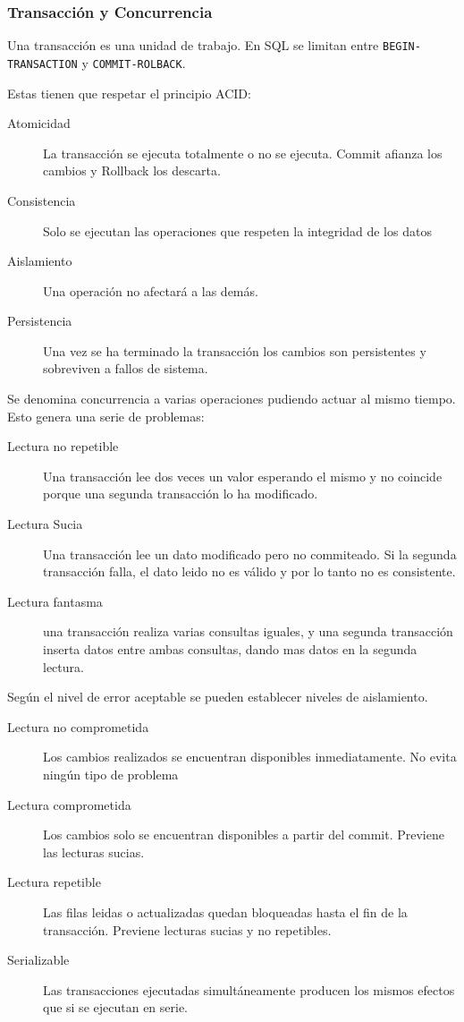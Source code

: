     \subsubsection{Transacción y Concurrencia}
        Una transacción es una unidad de trabajo. En SQL se limitan entre \texttt{BEGIN-TRANSACTION} y \texttt{COMMIT-ROLBACK}.

        Estas tienen que respetar el principio ACID:
        \begin{description}
            \item[Atomicidad] La transacción se ejecuta totalmente o no se ejecuta. Commit afianza los cambios y Rollback los descarta.
            \item[Consistencia] Solo se ejecutan las operaciones que respeten la integridad de los datos
            \item[Aislamiento] Una operación no afectará a las demás.
            \item[Persistencia] Una vez se ha terminado la transacción los cambios son persistentes y sobreviven a fallos de sistema.
        \end{description}

        Se denomina concurrencia a varias operaciones pudiendo actuar al mismo tiempo. Esto genera una serie de problemas:
        \begin{description}
            \item[Lectura no repetible] Una transacción lee dos veces un valor esperando el mismo y no coincide porque una segunda transacción lo ha modificado.
            \item[Lectura Sucia] Una transacción lee un dato modificado pero no commiteado. Si la segunda transacción falla, el dato leido no es válido y por lo tanto no es consistente.
            \item[Lectura fantasma] una transacción realiza varias consultas iguales, y una segunda transacción inserta datos entre ambas consultas, dando mas datos en la segunda lectura.
        \end{description}

        Según el nivel de error aceptable se pueden establecer niveles de aislamiento.

        \begin{description}
            \item[Lectura no comprometida] Los cambios realizados se encuentran disponibles inmediatamente. No evita ningún tipo de problema
            \item[Lectura comprometida] Los cambios solo se encuentran disponibles a partir del commit. Previene las lecturas sucias.
            \item[Lectura repetible] Las filas leidas o actualizadas quedan bloqueadas hasta el fin de la transacción. Previene lecturas sucias y no repetibles.
            \item[Serializable] Las transacciones ejecutadas simultáneamente producen los mismos efectos que si se ejecutan en serie.
        \end{description}

